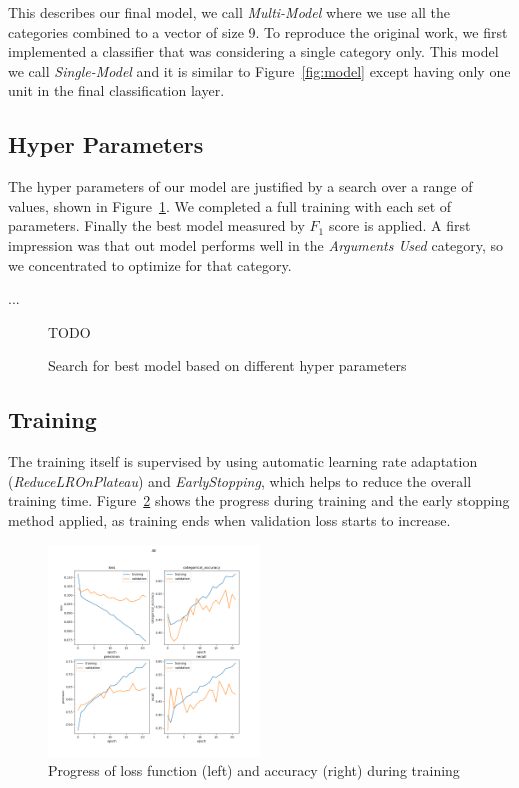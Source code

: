 \documentclass[11pt,a4paper]{article}
\begin{document}
This describes our final model, we call \textit{Multi-Model} where we use all the categories combined to a vector of size 9.
To reproduce the original work, we first implemented a classifier that was considering a single category only. 
This model we call \textit{Single-Model} and it is similar to Figure~\ref{fig:model} except having only one unit in the final classification layer.


\subsection{Hyper Parameters}

The hyper parameters of our model are justified by a search over a range of values, shown in Figure~\ref{fig:hyper_params}. We completed a full training with each set of parameters. Finally the best model measured by $F_1$ score is applied. A first impression was that out model performs well in the \textit{Arguments Used} category, so we concentrated to optimize for that category.

...
\begin{figure}[h!]
	\centering
	TODO
	\caption{Search for best model based on different hyper parameters}
	\label{fig:hyper_params}
\end{figure}


\subsection{Training}

The training itself is supervised by using automatic learning rate adaptation (\textit{ReduceLROnPlateau}) and \textit{EarlyStopping}, which helps to reduce the overall training time.
Figure~\ref{fig:training_loss} shows the progress during training and the early stopping method applied, as training ends when validation loss starts to increase.

\begin{figure}[h!]
	\centering
	\includegraphics[trim={1.4cm 12.4cm 2cm 2.5cm},clip,width=0.5\textwidth]{img/training_All_22}
	\caption{Progress of loss function (left) and accuracy (right) during training}
	\label{fig:training_loss}
\end{figure}
\end{document}
